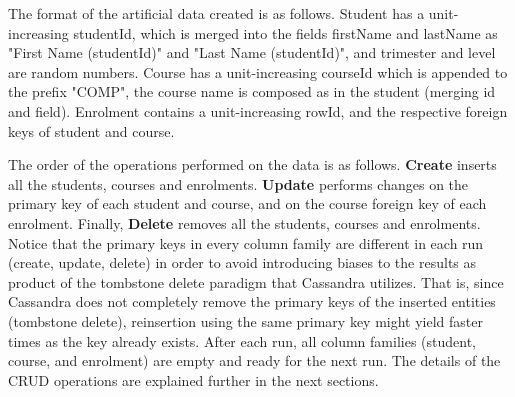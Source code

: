 The format of the artificial data created is as follows. Student has a
unit-increasing studentId, which is merged into the fields firstName and
lastName as "First Name (studentId)" and "Last Name (studentId)", and trimester
and level are random numbers. Course has a   unit-increasing courseId which is
appended to the prefix "COMP", the course name is composed as in the student
(merging id and field). Enrolment contains a unit-increasing rowId, and the
respective foreign keys of student and course.
		
The order of the operations performed on the data is as follows. \textbf{Create}
inserts all the students, courses and enrolments. \textbf{Update} performs
changes on the primary key of each student and course, and on the course foreign
key of each enrolment. Finally, \textbf{Delete} removes all the students,
courses and enrolments. Notice that the primary keys in every column family are
different in each run (create, update, delete) in order to avoid introducing
biases to the results as product of the tombstone delete paradigm that Cassandra
utilizes. That is, since Cassandra does not completely remove the primary keys
of the inserted entities (tombstone delete), reinsertion using the same primary
key might yield faster times as the key already exists. After each run, all
column families (student, course, and enrolment) are empty and ready for the
next run.  The details  of the \ac{CRUD} operations are explained further in the
next sections.
		
